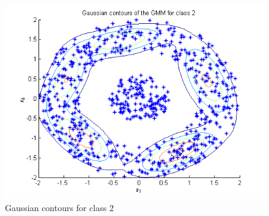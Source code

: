 \documentclass{article}
\begin{document}
\begin{figure}[H]
\centering
\includegraphics[width=\linewidth]{Classification/nonlinearlySeparable/gmm_2.png}
\caption{Gaussian contours for class 2}
\end{figure}
\end{document}
